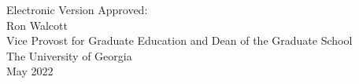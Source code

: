 \documentclass[12pt, notitlepage, twoside]{report}
\begin{document}
\vspace*{3cm}

\begin{flushleft}
  Electronic Version Approved:\\[12pt]
  Ron Walcott\\
  Vice Provost for Graduate Education and Dean of the Graduate School\\
  The University of Georgia\\
  May 2022
\end{flushleft}
\vspace*{1.5cm}



\setcounter{tocdepth}{1}
\renewcommand{\contentsname}{\MakeUppercase{Table of Contents}}
\tableofcontents

\iffigures
\newpage
{}
\listoffigures
\fi

\iftables
\newpage
{}
\listoftables
\fi

\clearpage
{}
\end{document}
